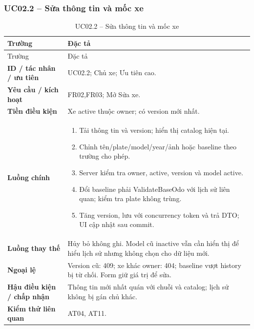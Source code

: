 \subsubsection{UC02.2 -- Sửa thông tin và mốc xe}\label{uc:UC02.2}
\begin{smalltable}\begin{longtable}{L{3.2cm}L{11.8cm}}
\caption{UC02.2 -- Sửa thông tin và mốc xe}\label{tab:UC02.2}\\
\toprule Trường & Đặc tả\\\midrule\endfirsthead
\toprule Trường & Đặc tả\\\midrule\endhead
\textbf{ID / tác nhân / ưu tiên} & UC02.2; Chủ xe; Ưu tiên cao.\\
\textbf{Yêu cầu / kích hoạt} & FR02,FR03; Mở Sửa xe.\\
\textbf{Tiền điều kiện} & Xe active thuộc owner; có version mới nhất.\\
\textbf{Luồng chính} & \begin{enumerate}[leftmargin=*,nosep]
\item Tải thông tin và version; hiển thị catalog hiện tại.
\item Chỉnh tên/plate/model/year/ảnh hoặc baseline theo trường cho phép.
\item Server kiểm tra owner, active, version và model active.
\item Đổi baseline phải ValidateBaseOdo với lịch sử liên quan; kiểm tra plate không trùng.
\item Tăng version, lưu với concurrency token và trả DTO; UI cập nhật sau commit.
\end{enumerate}\\
\textbf{Luồng thay thế} & Hủy bỏ không ghi. Model cũ inactive vẫn cần hiển thị để hiểu lịch sử nhưng không chọn cho dữ liệu mới.\\
\textbf{Ngoại lệ} & Version cũ: 409; xe khác owner: 404; baseline vượt history bị từ chối. Form giữ giá trị để sửa.\\
\textbf{Hậu điều kiện / chấp nhận} & Thông tin mới nhất quán với chuỗi và catalog; lịch sử không bị gán chủ khác.\\
\textbf{Kiểm thử liên quan} & AT04, AT11.\\
\bottomrule\end{longtable}\end{smalltable}
